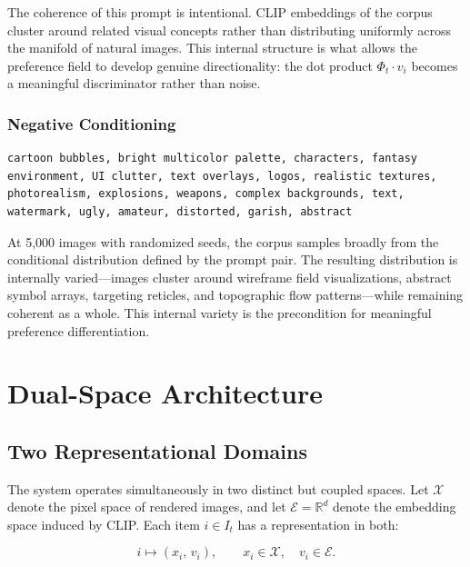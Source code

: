 \documentclass[12pt, a4paper]{article}
\theoremstyle{definition}
\begin{document}
The coherence of this prompt is intentional. CLIP embeddings of the corpus cluster around related visual concepts rather than distributing uniformly across the manifold of natural images. This internal structure is what allows the preference field to develop genuine directionality: the dot product $\Phi_t \cdot v_i$ becomes a meaningful discriminator rather than noise.

\subsubsection{Negative Conditioning}

\begin{lstlisting}[language={},caption={Negative CLIPTextEncode prompt (node id:7)}]
cartoon bubbles, bright multicolor palette, characters, fantasy 
environment, UI clutter, text overlays, logos, realistic textures, 
photorealism, explosions, weapons, complex backgrounds, text, 
watermark, ugly, amateur, distorted, garish, abstract
\end{lstlisting}

At 5,000 images with randomized seeds, the corpus samples broadly from the conditional distribution defined by the prompt pair. The resulting distribution is internally varied---images cluster around wireframe field visualizations, abstract symbol arrays, targeting reticles, and topographic flow patterns---while remaining coherent as a whole. This internal variety is the precondition for meaningful preference differentiation.

\section{Dual-Space Architecture}

\subsection{Two Representational Domains}

The system operates simultaneously in two distinct but coupled spaces. Let $\mathcal{X}$ denote the pixel space of rendered images, and let $\mathcal{E} = \mathbb{R}^d$ denote the embedding space induced by CLIP. Each item $i \in I_t$ has a representation in both:

\begin{equation}
i \mapsto (x_i,\, v_i), \qquad x_i \in \mathcal{X},\quad v_i \in \mathcal{E}.
\end{equation}
\end{document}

